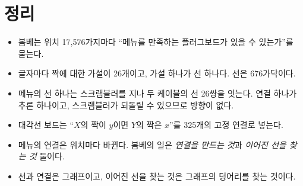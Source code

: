 \section{정리}

\begin{itemize}
\item 봄베는 위치 17,576가지마다 ``메뉴를 만족하는 플러그보드가 있을 수 있는가''를 묻는다.
\item 글자마다 짝에 대한 가설이 26개이고, 가설 하나가 선 하나다. 선은 676가닥이다.
\item 메뉴의 선 하나는 스크램블러를 지나 두 케이블의 선 26쌍을 잇는다. 연결 하나가 추론 하나이고, 스크램블러가
되돌릴 수 있으므로 방향이 없다.
\item 대각선 보드는 ``$X$의 짝이 $y$이면 $Y$의 짝은 $x$''를 325개의 고정 연결로 넣는다.
\item 메뉴의 연결은 위치마다 바뀐다. 봄베의 일은 \emph{연결을 만드는 것}과 \emph{이어진 선을 찾는 것} 둘이다.
\item 선과 연결은 그래프이고, 이어진 선을 찾는 것은 그래프의 덩어리를 찾는 것이다.
\end{itemize}
